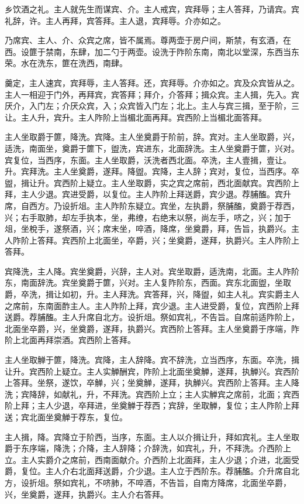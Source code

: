 \documentclass[]{article}
\begin{document}
乡饮酒之礼。主人就先生而谋宾、介。主人戒宾，宾拜辱；主人答拜，乃请宾。宾礼辞，许。主人再拜，宾答拜。主人退，宾拜辱。介亦如之。

乃席宾、主人、介、众宾之席，皆不属焉。尊两壶于房户间，斯禁，有玄酒，在西。设篚于禁南，东肆，加二勺于两壶。设洗于阼阶东南，南北以堂深，东西当东荣。水在洗东，篚在洗西，南肆。

羹定，主人速宾，宾拜辱，主人答拜。还，宾拜辱。介亦如之。宾及众宾皆从之。主人一相迎于门外，再拜宾，宾答拜；拜介，介答拜；揖众宾。主人揖，先入。宾厌介，入门左；介厌众宾，入；众宾皆入门左；北上。主人与宾三揖，至于阶，三让。主人升，宾升。主人阼阶上当楣北面再拜。宾西阶上当楣北面答拜。

主人坐取爵于篚，降洗。宾降。主人坐奠爵于阶前，辞。宾对。主人坐取爵，兴，适洗，南面坐，奠爵于篚下，盥洗，宾进东，北面辞洗。主人坐奠爵于篚，兴对。宾复位，当西序，东面。主人坐取爵，沃洗者西北面。卒洗，主人壹揖，壹让。升。宾拜洗。主人坐奠爵，遂拜。降盥。宾降，主人辞；宾对，复位，当西序。卒盥，揖让升。宾西阶上疑立。主人坐取爵，实之宾之席前，西北面献宾。宾西阶上拜，主人少退。宾进受爵，以复位。主人阼阶上拜送爵，宾少退。荐脯醢。宾升席，自西方。乃设折俎。主人阼阶东疑立。宾坐，左执爵，祭脯醢，奠爵于荐西，兴；右手取肺，却左手执本，坐，弗缭，右绝末以祭，尚左手，哜之，兴；加于俎，坐梲手，遂祭酒，兴；席末坐，啐酒，降席，坐奠爵，拜，告旨，执爵兴。主人阼阶上答拜。宾西阶上北面坐，卒爵，兴；坐奠爵，遂拜，执爵兴。主人阼阶上答拜。

宾降洗，主人降。宾坐奠爵，兴辞，主人对。宾坐取爵，适洗南，北面。主人阼阶东，南面辞洗。宾坐奠爵于篚，兴对。主人复阼阶东，西面。宾东北面盥，坐取爵，卒洗，揖让如初，升。主人拜洗。宾答拜，兴，降盥，如主人礼。宾实爵主人之席前，东南面酢主人。主人阼阶上拜，宾少退。主人进受爵，复位，宾西阶上拜送爵。荐脯醢。主人升席自北方。设折俎。祭如宾礼，不告旨。自席前适阼阶上，北面坐卒爵，兴，坐奠爵，遂拜，执爵兴。宾西阶上答拜。主人坐奠爵于序端，阼阶上北面再拜崇酒。宾西阶上答拜。

主人坐取觯于篚，降洗。宾降，主人辞降。宾不辞洗，立当西序，东面。卒洗，揖让升。宾西阶上疑立。主人实觯酬宾，阼阶上北面坐奠觯，遂拜，执觯兴。宾西阶上答拜。坐祭，遂饮，卒觯，兴；坐奠觯，遂拜，执觯兴。宾西阶上答拜。主人降洗；宾降辞，如献礼，升，不拜洗。宾西阶上立；主人实觯宾之席前，北面；宾西阶上拜；主人少退，卒拜进，坐奠觯于荐西；宾辞，坐取觯，复位；主人阼阶上拜送；宾北面坐奠觯于荐东，复位。

主人揖，降。宾降立于阶西，当序，东面。主人以介揖让升，拜如宾礼。主人坐取爵于东序端，降洗；介降，主人辞降；介辞洗，如宾礼，升，不拜洗。介西阶上立。主人实爵介之席前，西南面献介。介西阶上北面拜，主人少退；介进，北面受爵，复位。主人介右北面拜送爵，介少退。主人立于西阶东。荐脯醢。介升席自北方，设折俎。祭如宾礼，不哜肺，不啐酒，不告旨，自南方降席，北面坐卒爵，兴，坐奠爵，遂拜，执爵兴。主人介右答拜。
\end{document}
